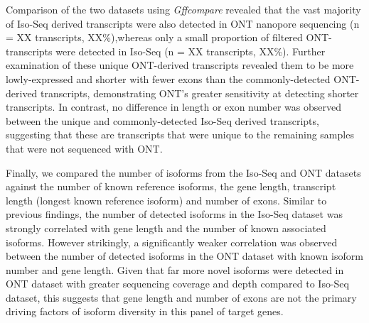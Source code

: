 \begin{figure}[t]
	\captionsetup{width=0.95\textwidth}
\end{figure}

Comparison of the two datasets using \textit{Gffcompare} revealed that the vast majority of Iso-Seq derived transcripts were also detected in ONT nanopore sequencing (n = XX transcripts, XX\%),whereas only a small proportion of filtered ONT-transcripts were detected in Iso-Seq (n = XX transcripts, XX\%). Further examination of these unique ONT-derived transcripts revealed them to be more lowly-expressed and shorter with fewer exons than the commonly-detected ONT-derived transcripts, demonstrating ONT's greater sensitivity at detecting shorter transcripts. In contrast, no difference in length or exon number was observed between the unique and commonly-detected Iso-Seq derived transcripts, suggesting that these are transcripts that were unique to the remaining samples that were not sequenced with ONT. 

Finally, we compared the number of isoforms from the Iso-Seq and ONT datasets against the number of known reference isoforms, the gene length, transcript length (longest known reference isoform) and number of exons. Similar to previous findings, the number of detected isoforms in the Iso-Seq dataset was strongly correlated with gene length and the number of known associated isoforms. However strikingly, a significantly weaker correlation was observed between the number of detected isoforms in the ONT dataset with known isoform number and gene length. Given that far more novel isoforms were detected in ONT dataset with greater sequencing coverage and depth compared to Iso-Seq dataset, this suggests that gene length and number of exons are not the primary driving factors of isoform diversity in this panel of target genes. 



